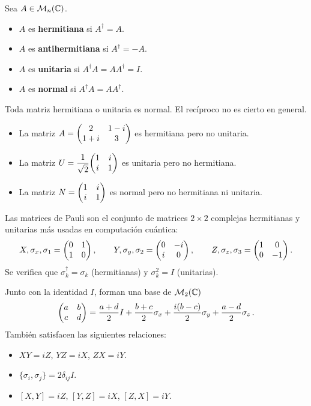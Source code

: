 \begin{defi}
  Sea $A\in\mathcal{M}_n(\mathbb{C})$.
  \begin{itemize}
    \item $A$ es \textbf{hermitiana} si $A^\dagger = A$.
    \item $A$ es \textbf{antihermitiana} si $A^\dagger = -A$.
    \item $A$ es \textbf{unitaria} si $A^\dagger A = AA^\dagger = I$.
    \item $A$ es \textbf{normal} si $A^\dagger A = AA^\dagger$.
  \end{itemize}
\end{defi}

Toda matriz hermitiana o unitaria es normal. El recíproco no es cierto en general.

\begin{eje}
  \begin{itemize}
    \item La matriz $A=\mqty(2 & 1-i \\ 1+i & 3)$ es hermitiana pero no unitaria.
    \item La matriz $U=\dfrac{1}{\sqrt{2}}\mqty(1 & i \\ i & 1)$ es unitaria pero no hermitiana.
    \item La matriz $N=\mqty(1 & i \\ i & 1)$ es normal pero no hermitiana ni unitaria.
  \end{itemize}
\end{eje}

\begin{eje}
  Las matrices de Pauli son el conjunto de matrices $2\times 2$ complejas hermitianas y unitarias más usadas en computación cuántica:
  \[
    X, \sigma_x, \sigma_1 = \mqty(0 & 1 \\ 1 & 0)\,,\qquad
    Y, \sigma_y, \sigma_2 = \mqty(0 & -i \\ i & 0)\,,\qquad
    Z, \sigma_z, \sigma_3 = \mqty(1 & 0 \\ 0 & -1)\,.
  \]
  Se verifica que $\sigma_k^\dagger=\sigma_k$ (hermitianas) y $\sigma_k^2=I$ (unitarias).

  Junto con la identidad $I$, forman una base de $\mathcal{M}_2(\mathbb{C})$
  \[
    \mqty(a & b \\ c & d) = \frac{a+d}{2}I + \frac{b+c}{2}\sigma_x + \frac{i(b-c)}{2}\sigma_y + \frac{a-d}{2}\sigma_z\,.
  \]
  También satisfacen las siguientes relaciones:
  \begin{itemize}
    \item $XY=iZ$, $YZ=iX$, $ZX=iY$.
    \item $\{\sigma_i,\sigma_j\}=2\delta_{ij}I$.
    \item $[X,Y]=iZ$, $[Y,Z]=iX$, $[Z,X]=iY$.
  \end{itemize}
\end{eje}

